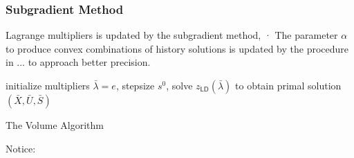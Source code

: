 \documentclass[
  a4paper,
,tablecaptionabove
]{scrartcl}
\numberwithin{equation}{section}
\begin{document}
\hypertarget{subgradient-method}{%
  \subsubsection{Subgradient Method}\label{subgradient-method}}

Lagrange multipliers is updated by the subgradient method, ·
The parameter \(\alpha\) to produce convex combinations of history solutions is updated by the procedure in ... to approach better precision.


\begin{algorithm}[H]
  \SetAlgoLined
  initialize multipliers \(\bar \lambda = e\), stepsize \(s^0\), solve \(z_\mathsf{LD}(\bar \lambda) \)
  to obtain primal solution \((\bar X, \bar U, \bar S) \)  \;
  \caption{The Volume Algorithm}
\end{algorithm}

Notice:
\end{document}
